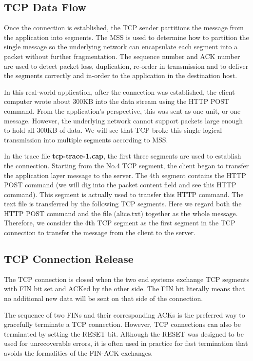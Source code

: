 \subsection{TCP Data Flow}

\hspace*{0.5cm} Once the connection is established, the TCP sender
partitions the message from the application into segments. The MSS is
used to determine how to partition the single message so the
underlying network can encapsulate each segment into a packet without
further fragmentation.  The sequence number and ACK number are used to
detect packet loss, duplication, re-order in transmission and to
deliver the segments correctly and in-order to the application in the
destination host.

In this real-world application, after the connection was established,
the client computer wrote about 300KB into the data stream using
the HTTP POST command. From the application's perspective, this was
sent as one unit, or one message. However, the underlying network
cannot support packets large enough to hold all 300KB of
data. We will see that TCP broke this single logical transmission into
multiple segments according to MSS.

In the trace file {\bf tcp-trace-1.cap}, the first three segments are
used to establish the connection. Starting from the No.4 TCP segment,
the client  began to transfer the application layer message to
the server. The 4th segment contains the HTTP POST command (we will
dig into the packet content field and see this HTTP command).  This
segment is actually used to transfer this HTTP command. The text file
is transferred by the following TCP segments. Here we regard both the
HTTP POST command and the file (alice.txt) together as the whole
message. Therefore, we consider the 4th TCP segment as the first
segment in the TCP connection to transfer the message from the
client to the server.

\subsection{TCP Connection Release}

\hspace*{0.5cm} The TCP connection is closed when the two end systems
exchange TCP segments with FIN bit set and ACKed by the other side.
The FIN bit literally means that no additional new data will be sent
on that side of the connection.

The sequence of two FINs and their corresponding ACKs is the preferred
way to gracefully terminate a TCP connection. However, TCP connections
can also be terminated by setting the RESET bit.  Although the RESET
was designed to be used for unrecoverable errors, it is often used in
practice for fast termination that avoids the formalities of the
FIN-ACK exchanges.

